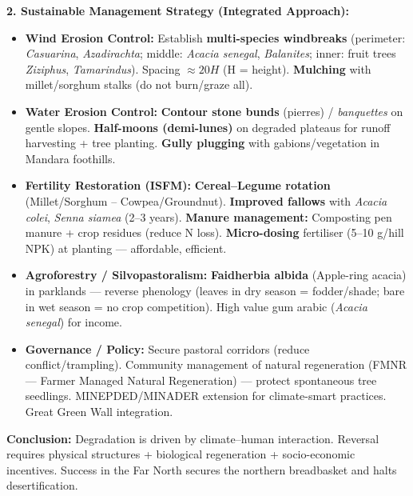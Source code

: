 \documentclass[11pt]{article}
\begin{document}
\begin{exoresolu}
\textbf{2. Sustainable Management Strategy (Integrated Approach):}
\begin{itemize}
    \item \textbf{Wind Erosion Control:} Establish \textbf{multi-species windbreaks} (perimeter: \emph{Casuarina}, \emph{Azadirachta}; middle: \emph{Acacia senegal}, \emph{Balanites}; inner: fruit trees \emph{Ziziphus}, \emph{Tamarindus}). Spacing $\approx 20H$ (H = height). \textbf{Mulching} with millet/sorghum stalks (do not burn/graze all).
    \item \textbf{Water Erosion Control:} \textbf{Contour stone bunds} (pierres) / \emph{banquettes} on gentle slopes. \textbf{Half-moons (demi-lunes)} on degraded plateaus for runoff harvesting + tree planting. \textbf{Gully plugging} with gabions/vegetation in Mandara foothills.
    \item \textbf{Fertility Restoration (ISFM):} \textbf{Cereal–Legume rotation} (Millet/Sorghum – Cowpea/Groundnut). \textbf{Improved fallows} with \emph{Acacia colei}, \emph{Senna siamea} (2–3 years). \textbf{Manure management:} Composting pen manure + crop residues (reduce N loss). \textbf{Micro-dosing} fertiliser (5–10 g/hill NPK) at planting — affordable, efficient.
    \item \textbf{Agroforestry / Silvopastoralism:} \textbf{Faidherbia albida} (Apple-ring acacia) in parklands — reverse phenology (leaves in dry season = fodder/shade; bare in wet season = no crop competition). High value gum arabic (\emph{Acacia senegal}) for income.
    \item \textbf{Governance / Policy:} Secure pastoral corridors (reduce conflict/trampling). Community management of natural regeneration (FMNR — Farmer Managed Natural Regeneration) — protect spontaneous tree seedlings. MINEPDED/MINADER extension for climate-smart practices. Great Green Wall integration.
\end{itemize}

\textbf{Conclusion:} Degradation is driven by climate–human interaction. Reversal requires physical structures + biological regeneration + socio-economic incentives. Success in the Far North secures the northern breadbasket and halts desertification.
\end{exoresolu}
\end{document}
